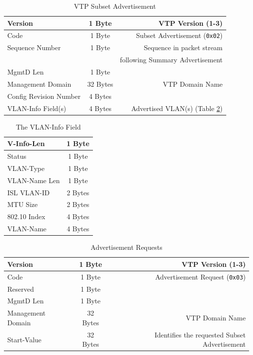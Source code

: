 \documentclass[12pt]{article}
\begin{document}
	\begin{table}[H]
	\centering
	\caption{VTP Subset Advertisement \label{tab:VTP SUBSET}}
	\begin{tabular}{| l | c | r |}
	\hline
	Version				& 1 Byte	& VTP Version (1-3)\\\hline
	Code					& 1 Byte	& Subset Advertisement (\texttt{0x02})\\\hline
	Sequence Number		& 1 Byte	& Sequence in packet stream\\
						&		& following Summary Advertisement\\\hline
	MgmtD Len				& 1 Byte	&\\\hline
	Management Domain		& 32 Bytes	& VTP Domain Name\\\hline
	Config Revision Number	& 4 Bytes	&\\\hline
	VLAN-Info Field(s)		& 4 Bytes	& Advertised VLAN(s) (Table \ref{tab:VTP VLAN})\\\hline
	\end{tabular}\end{table}

	\begin{table}[H]
	\centering
	\caption{The VLAN-Info Field \label{tab:VTP VLAN}}
	\begin{tabular}{| l | c |}
	\hline
	V-Info-Len				& 1 Byte\\\hline
	Status				& 1 Byte\\\hline
	VLAN-Type				& 1 Byte\\\hline
	VLAN-Name Len			& 1 Byte\\\hline
	ISL VLAN-ID			& 2 Bytes\\\hline
	MTU Size				& 2 Bytes\\\hline
	802.10 Index			& 4 Bytes\\\hline
	VLAN-Name			& 4 Bytes\\\hline
	\end{tabular}\end{table}

	\begin{table}[H]
	\centering
	\caption{Advertisement Requests \label{tab:VTP REQUEST}}
	\begin{tabular}{| l | c | r |}
	\hline
	Version				& 1 Byte	& VTP Version (1-3)\\\hline
	Code					& 1 Byte	& Advertisement Request (\texttt{0x03})\\\hline
	Reserved				& 1 Byte	&\\\hline
	MgmtD Len				& 1 Byte	&\\\hline
	Management Domain		& 32 Bytes	& VTP Domain Name\\\hline
	Start-Value				& 32 Bytes	& Identifies the requested Subset Advertisement\\\hline
	\end{tabular}\end{table}
\end{document}
